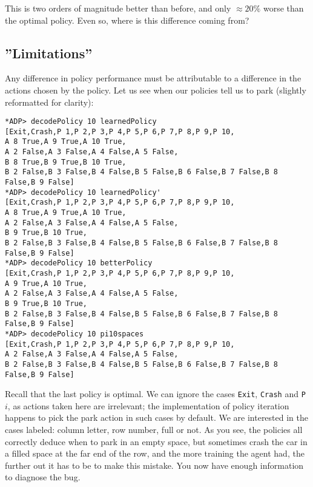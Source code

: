 \documentclass[paper=letter,pagesize=automedia,twoside=false,12pt]{scrartcl}
\theoremstyle{plain}%
\theoremstyle{definition}
\theoremstyle{remark}
\begin{document}
This is two orders of magnitude better than before, and only \(\approx 20\%\) worse than the optimal policy.  Even so, where is this difference coming from?

\subsection{”Limitations”}\label{sec:rebugs}
Any difference in policy performance must be attributable to a difference in the actions chosen by the policy.  Let us see when our policies tell us to park (slightly reformatted for clarity):

\begin{verbatim}
*ADP> decodePolicy 10 learnedPolicy 
[Exit,Crash,P 1,P 2,P 3,P 4,P 5,P 6,P 7,P 8,P 9,P 10,
A 8 True,A 9 True,A 10 True,
A 2 False,A 3 False,A 4 False,A 5 False,
B 8 True,B 9 True,B 10 True,
B 2 False,B 3 False,B 4 False,B 5 False,B 6 False,B 7 False,B 8 False,B 9 False]
*ADP> decodePolicy 10 learnedPolicy'
[Exit,Crash,P 1,P 2,P 3,P 4,P 5,P 6,P 7,P 8,P 9,P 10,
A 8 True,A 9 True,A 10 True,
A 2 False,A 3 False,A 4 False,A 5 False,
B 9 True,B 10 True,
B 2 False,B 3 False,B 4 False,B 5 False,B 6 False,B 7 False,B 8 False,B 9 False]
*ADP> decodePolicy 10 betterPolicy 
[Exit,Crash,P 1,P 2,P 3,P 4,P 5,P 6,P 7,P 8,P 9,P 10,
A 9 True,A 10 True,
A 2 False,A 3 False,A 4 False,A 5 False,
B 9 True,B 10 True,
B 2 False,B 3 False,B 4 False,B 5 False,B 6 False,B 7 False,B 8 False,B 9 False]
*ADP> decodePolicy 10 pi10spaces  
[Exit,Crash,P 1,P 2,P 3,P 4,P 5,P 6,P 7,P 8,P 9,P 10,
A 2 False,A 3 False,A 4 False,A 5 False,
B 2 False,B 3 False,B 4 False,B 5 False,B 6 False,B 7 False,B 8 False,B 9 False]
\end{verbatim}

Recall that the last policy is optimal.  We can ignore the cases \texttt{Exit}, \texttt{Crash} and \texttt{P} \(i\), as actions taken here are irrelevant; the implementation of policy iteration happens to pick the park action in such cases by default.  We are interested in the cases labeled: column letter, row number, full or not.  As you see, the policies all correctly deduce when to park in an empty space, but sometimes crash the car in a filled space at the far end of the row, and the more training the agent had, the further out it has to be to make this mistake.  You now have enough information to diagnose the bug.
\end{document}
